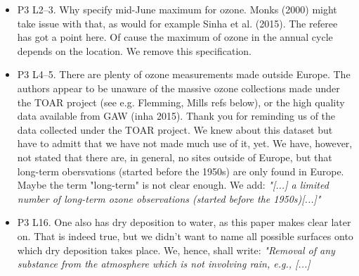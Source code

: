 \documentclass{scrartcl}
\begin{document}
\begin{itemize}
\item {\color{blue}P3 L2--3. Why specify mid-June maximum for ozone. Monks (2000) might
  take issue with that, as would for example Sinha et al. (2015).}
  The referee has got a point here. Of cause the maximum of ozone in the annual cycle depends on the location. We remove this specification.
\item {\color{blue}P3 L4--5. There are plenty of ozone measurements made outside Europe. The
authors appear to be unaware of the massive ozone collections made under the
TOAR project (see e.g. Flemming, Mills refs below), or the high quality data
available from GAW (inha 2015).}
  Thank you for reminding us of the data collected under the TOAR project. We knew about this dataset but have to admitt that we have not made much use of it, yet. We have, however, not stated that there are, in general, no sites outside of Europe, but that long-term obersvations (started before the 1950s) are only found in Europe. Maybe the term "long-term" is not clear enough. We add: \emph{"[...] a limited number of long-term ozone observations (started before the 1950s)[...]"}
  
\item {\color{blue}P3 L16. One also has dry deposition to water, as this paper makes clear later on.}
  That is indeed true, but we didn't want to name all possible surfaces onto which dry deposition takes place. We, hence, shall write: \emph{"Removal of any substance from the atmosphere which is not involving rain, e.g., [...]}
  

\end{itemize}
\end{document}
